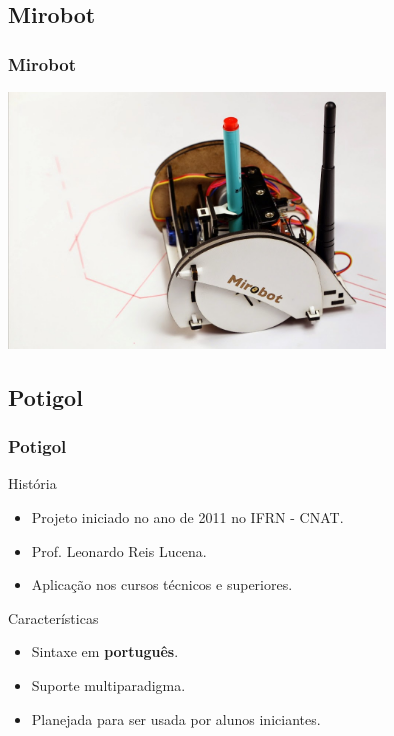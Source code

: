 \documentclass{beamer}
\begin{document}
\begin{frame}
  \label{mirobot}
  \subsection{Mirobot}
  \frametitle{Mirobot}
  
  \begin{center}
    \includegraphics[width=10cm]{imagens/mirobot.jpg}
  \end{center}

\end{frame}

\begin{frame}
  \label{Potigol}
  \subsection{Potigol}
  \frametitle{Potigol}
  \begin{block}{História ~\cite{HellenLemos}}
        \begin{itemize}
    \item Projeto iniciado no ano de 2011 no IFRN - CNAT.
    \item Prof. Leonardo Reis Lucena.
     \item Aplicação nos cursos técnicos e superiores.  
        \end{itemize}

  \end{block}
  
        \begin{block}{Características}
          \begin{itemize}
          \item Sintaxe em \textbf{português}.
          \item Suporte multiparadigma.
          \item Planejada para ser usada por alunos iniciantes.
          \end{itemize}
        \end{block}
\end{frame}
\end{document}
